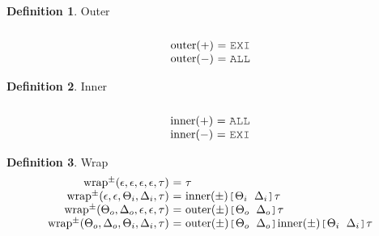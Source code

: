 \documentclass[acmsmall]{acmart}
\theoremstyle{definition}
\newtheorem{definition}{Definition}[section]
\begin{document}

\begin{definition}
  Outer
  \hfill
  \small
  \\
  \[\begin{array}[t]{r@{}c@{}lcl}
    \\
    \text{outer}(+) 
    &\ =\ & 
    \J{EXI} 
    \\
    \text{outer}(-) 
    &\ =\ & 
    \J{ALL} 
  \end{array}\]
\end{definition}

\begin{definition}
  Inner
  \hfill
  \small
  \\
  \[\begin{array}[t]{r@{}c@{}lcl}
    \\
    \text{inner}(+) 
    &\ =\ & 
    \J{ALL} 
    \\
    \text{inner}(-) 
    &\ =\ & 
    \J{EXI} 
  \end{array}\]
\end{definition}

\begin{definition}
  Wrap
  \hfill
  \small
  \\
  \[
  \begin{array}[t]{r@{}c@{}lcl}
    \text{wrap}^{\pm}(\epsilon, \epsilon, \epsilon, \epsilon, \tau) 
    &\ =\ & 
    \tau
    \\
    \text{wrap}^{\pm}(\epsilon, \epsilon, \Theta_i, \Delta_i, \tau) 
    &\ =\ & 
    \text{inner}(\pm)\J{[}\Theta_i\J{ }\Delta_i\J{]}\tau
    \\
    \text{wrap}^{\pm}(\Theta_o, \Delta_o, \epsilon, \epsilon, \tau) 
    &\ =\ & 
    \text{outer}(\pm)\J{[}\Theta_o\J{ }\Delta_o\J{]}\tau
    \\
    \text{wrap}^{\pm}(\Theta_o, \Delta_o, \Theta_i, \Delta_i, \tau) 
    &\ =\ & 
    \text{outer}(\pm)\J{[}\Theta_o\J{ }\Delta_o\J{]}
    \text{inner}(\pm)\J{[}\Theta_i\J{ }\Delta_i\J{]}
    \tau
  \end{array}\]
\end{definition}
\end{document}
